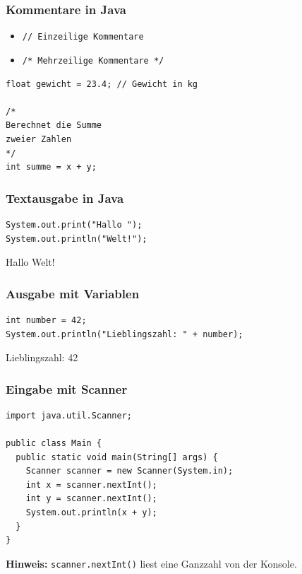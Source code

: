 \documentclass{../../presentation}
\begin{document}
\begin{frame}[fragile]
  \frametitle{Kommentare in Java}
  \begin{itemize}
    \item \texttt{// Einzeilige Kommentare}
    \item \texttt{/* Mehrzeilige Kommentare */}
  \end{itemize}

  \vspace{1em}
  \begin{verbatim}
float gewicht = 23.4; // Gewicht in kg

/*
Berechnet die Summe
zweier Zahlen
*/
int summe = x + y;
  \end{verbatim}
\end{frame}

\begin{frame}[fragile]
  \frametitle{Textausgabe in Java}
  \begin{verbatim}
System.out.print("Hallo ");
System.out.println("Welt!");
  \end{verbatim}
  \begin{ausgabe}
    Hallo Welt!
  \end{ausgabe}
\end{frame}

\begin{frame}[fragile]
  \frametitle{Ausgabe mit Variablen}
  \begin{verbatim}
int number = 42;
System.out.println("Lieblingszahl: " + number);
  \end{verbatim}
  \begin{ausgabe}
    Lieblingszahl: 42
  \end{ausgabe}
\end{frame}

\begin{frame}[fragile]
  \frametitle{Eingabe mit Scanner}
  \begin{verbatim}
import java.util.Scanner;

public class Main {
  public static void main(String[] args) {
    Scanner scanner = new Scanner(System.in);
    int x = scanner.nextInt();
    int y = scanner.nextInt();
    System.out.println(x + y);
  }
}
  \end{verbatim}
  \textbf{Hinweis:} \texttt{scanner.nextInt()} liest eine Ganzzahl von der Konsole.
\end{frame}
\end{document}
